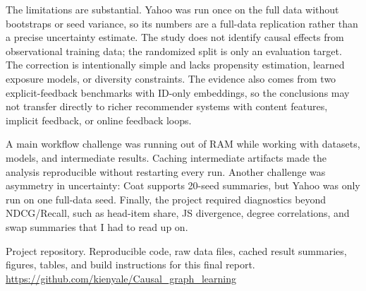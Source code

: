 \documentclass[10pt]{article}
\begin{document}
The limitations are substantial. Yahoo was run once on the full data without bootstraps or seed variance, so its numbers are a full-data replication rather than a precise uncertainty estimate. The study does not identify causal effects from observational training data; the randomized split is only an evaluation target. The correction is intentionally simple and lacks propensity estimation, learned exposure models, or diversity constraints. The evidence also comes from two explicit-feedback benchmarks with ID-only embeddings, so the conclusions may not transfer directly to richer recommender systems with content features, implicit feedback, or online feedback loops.

A main workflow challenge was running out of RAM while working with datasets, models, and intermediate results. Caching intermediate artifacts made the analysis reproducible without restarting every run. Another challenge was asymmetry in uncertainty: Coat supports 20-seed summaries, but Yahoo was only run on one full-data seed. Finally, the project required diagnostics beyond NDCG/Recall, such as head-item share, JS divergence, degree correlations, and swap summaries that I had to read up on.




Project repository.
\newblock Reproducible code, raw data files, cached result summaries, figures, tables, and build instructions for this final report.
\newblock \url{https://github.com/kienyale/Causal_graph_learning}
\end{document}
